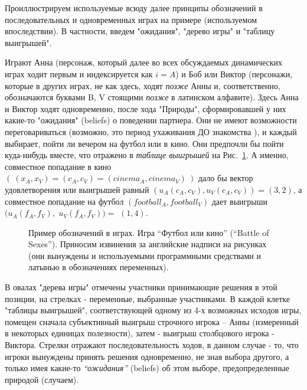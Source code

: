 \documentclass[a4paper,12pt]{article}
\begin{document}
Проиллюстрируем используемые всюду далее принципы обозначений в
последовательных и одновременных играх на примере (используемом
впоследствии). В частности, введем "ожидания", "дерево игры" и
"таблицу выигрышей".

\begin{exmp}

{\rm Играют Анна (персонаж, который далее во всех
обсуждаемых динамических играх ходит первым и индексируется
как $i=A$) и Боб или Виктор  (персонажи, которые в других
играх, не как здесь, ходят {\em позже} Анны и,
соответственно, обозначаются буквами B, V стоящими {\em
позже} в латинском алфавите). Здесь Анна и Виктор ходят
одновременно, после хода "Природы", сформировавшей у них
какие-то "ожидания" (beliefs) о поведении партнера. Они не
имеют возможности переговариваться (возможно, это период
ухаживания ДО знакомства  ), и каждый выбирает, пойти ли
вечером на футбол или в кино. Они предпочли бы пойти
куда-нибудь вместе, что отражено в {\em таблице выигрышей}
на Рис.~\ref{BatSex}. А именно, совместное попадание в кино
$(~(x_A,x_V)=(c_A,c_V)=(cinema_A,cinema_V)~)$ дало бы
вектор удовлетворения или выигрышей равный
$(u_A(c_A,c_V),u_V(c_A,c_V))=(3,2)$, а совместное попадание
на футбол $(football_A,football_V)$ дает выигрыши
$(u_A(f_A,f_V),$ $u_V(f_A,f_V))=$ $(1,4)$.

\begin{center}
\begin{figure}[h]
\caption{Пример обозначений в играх. Игра ``Футбол или
кино'' (``Battle of Sexes''). {Приносим извинения за
английские надписи на рисунках (они вынуждены и
используемыми программными средствами и латынью в
обозначениях переменных).} \label{BatSex}}
\end{figure}
\end{center}

В овалах "дерева игры" отмечены участники принимающие
решения в этой позиции, на стрелках - переменные, выбранные
участниками. В каждой клетке "таблицы выигрышей",
соответствующей одному из 4-х возможных исходов игры,
помещен сначала субъективный выигрыш строчного игрока --
Анны (измеренный в некоторых единицах полезности), затем -
выигрыш  столбцового игрока - Виктора. Стрелки отражают
последовательность ходов, в данном случае - то, что игроки
вынуждены принять решения одновременно, не зная выбора
другого, а только имея какие-то {\em ``ожидания''}
(beliefs) об этом выборе, предопределенные природой
(случаем).\vspace{2mm}

}
\end{exmp}
\end{document}
